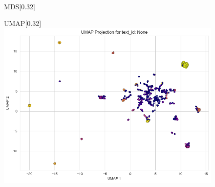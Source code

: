 \documentclass{article}
\begin{document}
\begin{figure}[H]
\begin{subcaptionbox}{MDS\label{fig:sl_b}}[0.32\textwidth]
  \end{subcaptionbox}
\hfill
  \begin{subcaptionbox}{UMAP\label{fig:sl_b}}[0.32\textwidth]
    {\centering\includegraphics[width=\linewidth]{plots/cluster_examples/hdbs_500examples_lev1D_trimmed_UMAP.png}}
  \end{subcaptionbox}

\end{figure}
\end{document}
